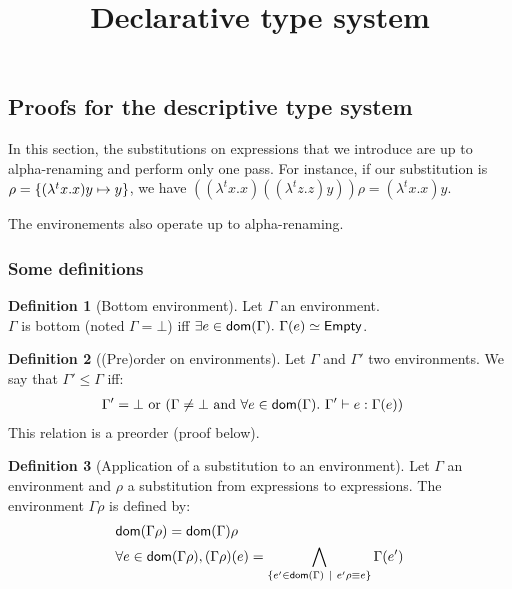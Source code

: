 \documentclass[a4paper]{article}
\title{\vspace{1.5cm}Declarative type system}
\author{}
\date{\vspace{-5ex}}
\theoremstyle{definition}
\newtheorem{definition}{Definition}
\begin{document}
  \maketitle

  \subsection{Proofs for the descriptive type system}

  In this section, the substitutions on expressions that we introduce are up to alpha-renaming and perform only one pass.
  For instance, if our substitution is $\rho=\{(\lambda^t x. x) y \mapsto y\}$, we have $((\lambda^t x. x)((\lambda^t z. z) y))\rho = (\lambda^t x. x) y$.
  
  The environements also operate up to alpha-renaming.

    \subsubsection{Some definitions}

    \begin{definition}[Bottom environment]
      Let $\Gamma$ an environment.\\
      $\Gamma$ is bottom (noted $\Gamma = \bot$) iff $\exists e\in\dom\Gamma.\ \Gamma(e)\simeq\Empty$.
    \end{definition}

      \begin{definition}[(Pre)order on environments]
        Let $\Gamma$ and $\Gamma'$ two environments. We say that $\Gamma' \leq \Gamma$ iff:
        \begin{align*}
          &\Gamma'=\bot \text{ or } (\Gamma\neq\bot \text{ and } \forall e \in \textsf{dom}(\Gamma).\ \Gamma' \vdash e : \Gamma(e))
        \end{align*}
        This relation is a preorder (proof below).
      \end{definition}
    
      \begin{definition}[Application of a substitution to an environment]
        Let $\Gamma$ an environment and $\rho$ a substitution from expressions to expressions.
        The environment $\Gamma\rho$ is defined by:
        \begin{align*}
          &\textsf{dom}(\Gamma\rho) = \textsf{dom}(\Gamma) \rho\\
          &\forall e \in \textsf{dom}(\Gamma\rho), (\Gamma\rho)(e) = \bigwedge_{\{e' \in \textsf{dom}(\Gamma) ~|~ e'\rho\equiv e\}}\Gamma(e')
        \end{align*}
      \end{definition}
    
\end{document}
